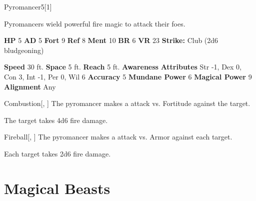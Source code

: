   
  \begin{monsection}{Pyromancer}{5}[1]
    \vspace{-1em}\vspace{-1em}
    \vspace{0em}

    
        Pyromancers wield powerful fire magic to attack their foes.
      

    \begin{spellcontent}
      \begin{spelltargetinginfo}
        \pari \textbf{HP} 5 \monsep
          \textbf{AD} 5 \monsep
          \textbf{Fort} 9 \monsep
          \textbf{Ref} 8 \monsep
          \textbf{Ment} 10
        \pari \textbf{BR} 6 \monsep
        \textbf{VR} 23
        \pari \textbf{Strike:}
            Club  (2d6 bludgeoning)
      \end{spelltargetinginfo}
    \end{spellcontent}
    \begin{monsterfooter}
      \pari \textbf{Speed} 30 ft. \monsep
        \textbf{Space} 5 ft. \monsep
        \textbf{Reach} 5 ft.
      \pari \textbf{Awareness} 
      \pari \textbf{Attributes}
        Str -1, Dex 0,
        Con 3, Int -1,
        Per 0, Wil 6
      \pari \textbf{Accuracy} 5 \monsep
        \textbf{Mundane Power} 6 \monsep
      \textbf{Magical Power} 9
      \pari \textbf{Alignment} Any
    \end{monsterfooter}
  \end{monsection}
  \begin{freeability}{Combustion}[, ]
       The pyromancer makes a  attack
        vs. Fortitude against the target.
    
    \hit The target takes 4d6 fire damage.
    \end{freeability}
  

    \begin{freeability}{Fireball}[, ]
       The pyromancer makes a  attack
        vs. Armor against each target.
    
    \hit Each target takes 2d6 fire damage.
    \end{freeability}
  
        \newpage
        \section{Magical Beasts}

